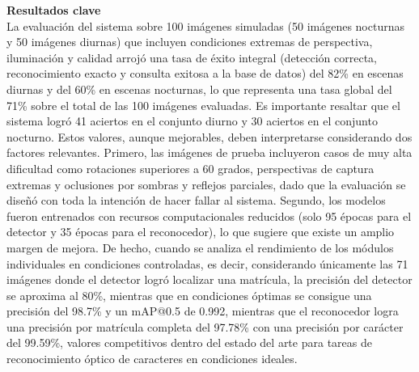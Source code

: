 {\sffamily{}\color{MASA-Blue} \textbf{Resultados clave}}\\
La evaluación del sistema sobre 100 imágenes simuladas (50 imágenes nocturnas y 50 imágenes diurnas) que incluyen condiciones extremas de perspectiva, iluminación y calidad arrojó una tasa de éxito integral (detección correcta, reconocimiento exacto y consulta exitosa a la base de datos) del 82\% en escenas diurnas y del 60\% en escenas nocturnas, lo que representa una tasa global del 71\% sobre el total de las 100 imágenes evaluadas. Es importante resaltar que el sistema logró 41 aciertos en el conjunto diurno y 30 aciertos en el conjunto nocturno. Estos valores, aunque mejorables, deben interpretarse considerando dos factores relevantes. Primero, las imágenes de prueba incluyeron casos de muy alta dificultad como rotaciones superiores a 60 grados, perspectivas de captura extremas y oclusiones por sombras y reflejos parciales, dado que la evaluación se diseñó con toda la intención de hacer fallar al sistema. Segundo, los modelos fueron entrenados con recursos computacionales reducidos (solo 95 épocas para el detector y 35 épocas para el reconocedor), lo que sugiere que existe un amplio margen de mejora. De hecho, cuando se analiza el rendimiento de los módulos individuales en condiciones controladas, es decir, considerando únicamente las 71 imágenes donde el detector logró localizar una matrícula, la precisión del detector se aproxima al 80\%, mientras que en condiciones óptimas se consigue una precisión del 98.7\% y un mAP@0.5 de 0.992, mientras que el reconocedor logra una precisión por matrícula completa del 97.78\% con una precisión por carácter del 99.59\%, valores competitivos dentro del estado del arte para tareas de reconocimiento óptico de caracteres en condiciones ideales.

